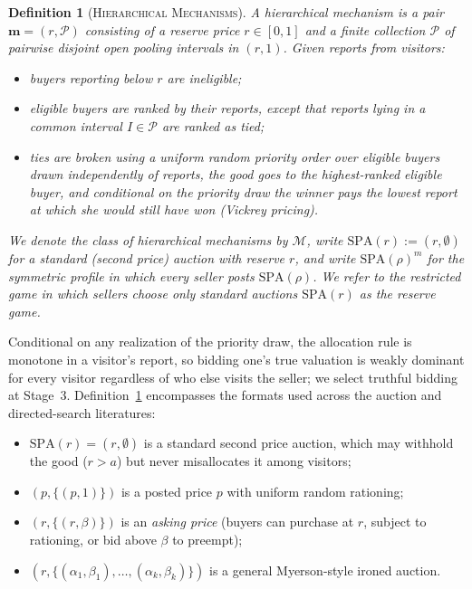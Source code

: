 \documentclass[12pt]{article}
\theoremstyle{mystyle}
\newtheorem{definition}{Definition}
\theoremstyle{mystyle2}
\newcommand{\M}{\mathcal{M}}
\newcommand{\cP}{\mathcal{P}}
\newcommand{\bmm}{\mathbf{m}}
\newcommand{\SPA}{\mathrm{SPA}}
\newcommand{\1}{\mathbf{1}}
\begin{document}
\begin{definition}[\textsc{Hierarchical Mechanisms}]\label{def:purestrat}
A \emph{hierarchical mechanism} is a pair $\bmm=(r,\cP)$ consisting of a reserve price $r\in[0,1]$ and a finite collection $\cP$ of pairwise disjoint open \emph{pooling intervals} in $(r,1)$. Given reports from visitors:
\begin{itemize}
\item buyers reporting below $r$ are ineligible;
\item eligible buyers are ranked by their reports, except that reports lying in a common interval $I\in\cP$ are ranked as tied;
\item ties are broken using a uniform random priority order over eligible buyers drawn independently of reports, the good goes to the highest-ranked eligible buyer, and conditional on the priority draw the winner pays the lowest report at which she would still have won (Vickrey pricing).
\end{itemize}
We denote the class of hierarchical mechanisms by $\M$, write $\SPA(r):=(r,\emptyset)$ for a \emph{standard (second price) auction} with reserve $r$, and write $\SPA(\rho)^m$ for the symmetric profile in which every seller posts $\SPA(\rho)$. We refer to the restricted game in which sellers choose only standard auctions $\SPA(r)$ as the \emph{reserve game}.
\end{definition}

Conditional on any realization of the priority draw, the allocation rule is monotone in a visitor's report, so bidding one's true valuation is weakly dominant for every visitor regardless of who else visits the seller; we select truthful bidding at Stage~3. Definition~\ref{def:purestrat} encompasses the formats used across the auction and directed-search literatures:
\begin{itemize}
\item $\SPA(r)=(r,\emptyset)$ is a standard second price auction, which may withhold the good ($r>a$) but never misallocates it among visitors;
\item $(p,\{(p,1)\})$ is a posted price $p$ with uniform random rationing;
\item $(r,\{(r,\beta)\})$ is an \emph{asking price} (buyers can purchase at $r$, subject to rationing, or bid above $\beta$ to preempt);
\item $(r,\{(\alpha_1,\beta_1),\dots,(\alpha_k,\beta_k)\})$ is a general Myerson-style ironed auction.
\end{itemize}
\end{document}
